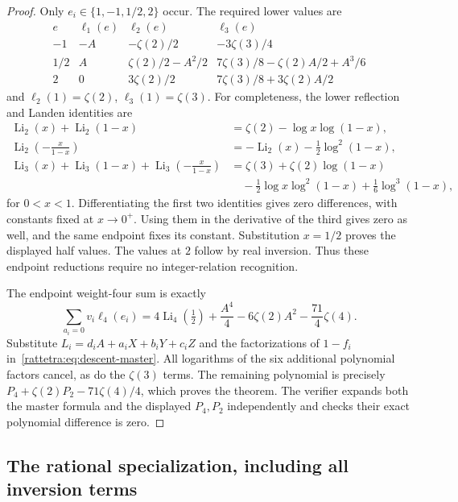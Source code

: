 \begin{proof}
Only $e_i\in\{1,-1,1/2,2\}$ occur. The required lower values are
\[
\begin{array}{c|ccc}
e&\ell_1(e)&\ell_2(e)&\ell_3(e)\\ \hline
-1&-A&-\zeta(2)/2&-3\zeta(3)/4\\
1/2&A&\zeta(2)/2-A^2/2&7\zeta(3)/8-\zeta(2)A/2+A^3/6\\
2&0&3\zeta(2)/2&7\zeta(3)/8+3\zeta(2)A/2
\end{array}
\]
and $\ell_2(1)=\zeta(2)$, $\ell_3(1)=\zeta(3)$.
For completeness, the lower reflection and Landen identities are
\begin{align*}
\operatorname{Li}_2(x)+\operatorname{Li}_2(1-x)
 &=\zeta(2)-\log x\log(1-x),\\
\operatorname{Li}_2\!\left(-\frac{x}{1-x}\right)
 &=-\operatorname{Li}_2(x)-\frac12\log^2(1-x),\\
\operatorname{Li}_3(x)+\operatorname{Li}_3(1-x)
 +\operatorname{Li}_3\!\left(-\frac{x}{1-x}\right)
 &=\zeta(3)+\zeta(2)\log(1-x)\\
 &\quad-\frac12\log x\log^2(1-x)+\frac16\log^3(1-x),
\end{align*}
for $0<x<1$. Differentiating the first two identities gives zero
differences, with constants fixed at $x\to0^+$. Using them in the
derivative of the third gives zero as well, and the same endpoint
fixes its constant. Substitution $x=1/2$ proves the displayed half
values. The values at $2$ follow by real inversion. Thus these
endpoint reductions require no integer-relation recognition.

The endpoint weight-four sum is exactly
\[
 \sum_{a_i=0}v_i\ell_4(e_i)
 =4\operatorname{Li}_4(\tfrac12)+\frac{A^4}{4}
       -6\zeta(2)A^2-\frac{71}{4}\zeta(4).
\]
Substitute $L_i=d_iA+a_iX+b_iY+c_iZ$ and the factorizations of
$1-f_i$ in~\eqref{rattetra:eq:descent-master}. All logarithms of the
six additional polynomial factors cancel, as do the $\zeta(3)$ terms.
The remaining polynomial is precisely
$P_4+\zeta(2)P_2-71\zeta(4)/4$, which proves the theorem.
The verifier expands both the master formula and the displayed
$P_4,P_2$ independently and checks their exact polynomial difference
is zero.
\end{proof}

\subsection{The rational specialization, including all inversion terms}


